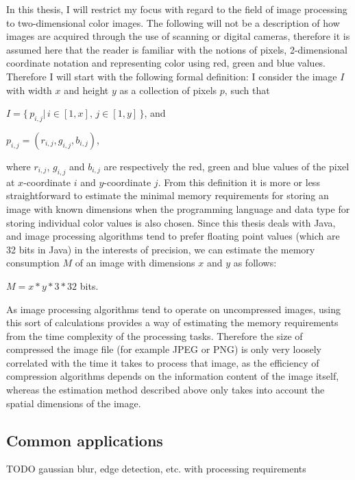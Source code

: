 \documentclass [12pt,a4paper]{report}
\begin{document}
In this thesis, I will restrict my focus with regard to the field of image processing to two-dimensional color images. The following will not be a description of how images are acquired through the use of scanning or digital cameras, therefore it is assumed here that the reader is familiar with the notions of pixels, 2-dimensional coordinate notation and representing color using red, green and blue values. Therefore I will start with the following formal definition: I consider the image $I$ with width $x$ and height $y$ as a collection of pixels $p$, such that

\begin{center}
$I = \{ \, p_{i,j} | \, i \in [1,x], \, j \in [1,y] \, \}$, and

$p_{i,j} = (r_{i,j}, g_{i,j}, b_{i,j})$,
\end{center}
where $r_{i,j}$, $g_{i,j}$ and $b_{i,j}$ are respectively the red, green and blue values of the pixel at $x$-coordinate $i$ and $y$-coordinate $j$. From this definition it is more or less straightforward to estimate the minimal memory requirements for storing an image with known dimensions when the programming language and data type for storing individual color values is also chosen. Since this thesis deals with Java, and image processing algorithms tend to prefer floating point values (which are 32 bits in Java) in the interests of precision, we can estimate the memory consumption $M$ of an image with dimensions $x$ and $y$ as follows:

\begin{center} 
$M = x * y * 3 * 32$ bits.
\end{center}

As image processing algorithms tend to operate on uncompressed images, using this sort of calculations provides a way of estimating the memory requirements from the time complexity of the processing tasks. Therefore the size of compressed the image file (for example JPEG or PNG) is only very loosely correlated with the time it takes to process that image, as the efficiency of compression algorithms depends on the information content of the image itself, whereas the estimation method described above only takes into account the spatial dimensions of the image.

\subsection{Common applications}

TODO gaussian blur, edge detection, etc. with processing requirements
\end{document}
